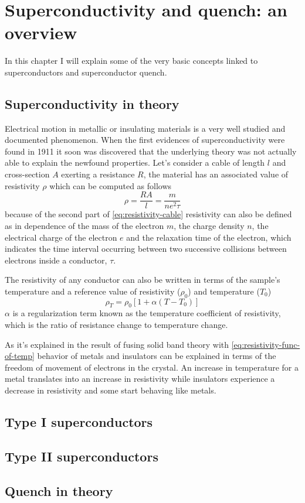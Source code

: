\chapter{Superconductivity and quench: an overview}
In this chapter I will explain some of the very basic concepts linked to superconductors and
superconductor quench.
\section{Superconductivity in theory}
Electrical motion in metallic or insulating materials is a very well studied and documented
phenomenon. When the first evidences of superconductivity were found in 1911
\cite{invention-superconductivity} it soon was discovered that
the underlying theory was not actually able to explain the newfound properties.
Let's consider a cable of length $l$ and cross-section $A$ exerting a resistance $R$, the material
has an associated value of resistivity $\rho$ which can be computed as follows
\begin{equation}
	\label{eq:resistivity-cable}
	\rho = \frac{RA}{l} = \frac{m}{ne^2\tau}
\end{equation}
because of the second part of \ref{eq:resistivity-cable} resistivity can also be defined as in dependence of the mass of the electron $m$, the charge
density $n$, the electrical charge of the electron $e$ and the relaxation time of the electron, which indicates the time interval occurring between two successive collisions between
electrons inside a conductor, $\tau$.

The resistivity of any conductor can also be written in terms of the sample's temperature and a reference
value of resistivity ($\rho_0$) and temperature ($T_0$)
\begin{equation}
	\label{eq:resistivity-func-of-temp}
	\rho_T = \rho_0[1 + \alpha(T - T_0)]
\end{equation}
$\alpha$ is a regularization term known as the temperature coefficient of resistivity, which is the
ratio of resistance change to temperature change.

As it's explained in \cite{slimani2022superconducting} the result of fusing solid band theory with
\ref{eq:resistivity-func-of-temp} behavior of metals and insulators can be explained in terms
of the freedom of movement of electrons in the crystal. An increase in temperature for a metal
translates into an increase in resistivity while insulators experience a decrease in resistivity
and some start behaving like metals.
\section{Type I superconductors}
\section{Type II superconductors}
\section{Quench in theory}
